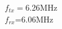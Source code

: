 \documentclass[preview]{standalone}
\begin{document}
\begin{center}
$f_{tx}=$6.26MHz\\$f_{rx}$=6.06MHz
\end{center}
\end{document}
